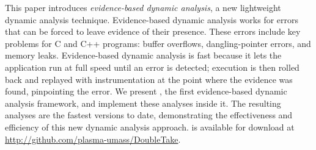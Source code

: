 This paper introduces \emph{evidence-based dynamic analysis}, a new
lightweight dynamic analysis technique. Evidence-based dynamic
analysis works for errors that can be forced to leave evidence of
their presence. These errors include key problems for C and C++
programs: buffer overflows, dangling-pointer errors, and memory
leaks. Evidence-based dynamic analysis is fast because it lets the
application run at full speed until an error is detected; execution is
then rolled back and replayed with instrumentation at the point where
the evidence was found, pinpointing the error. We
present \doubletake{}, the first evidence-based dynamic analysis
framework, and implement these analyses inside it. The resulting
analyses are the fastest versions to date, demonstrating the
effectiveness and efficiency of this new dynamic analysis approach.
\doubletake{} is available for download at \url{http://github.com/plasma-umass/DoubleTake}.

